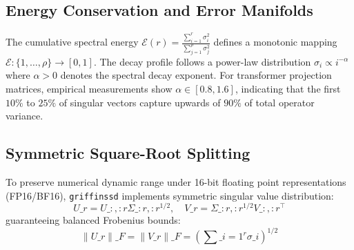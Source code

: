 \subsection{Energy Conservation and Error Manifolds}
The cumulative spectral energy $\mathcal{E}(r) = \frac{\sum_{i=1}^r \sigma_i^2}{\sum_{j=1}^\rho \sigma_j^2}$ defines a monotonic mapping $\mathcal{E}: \{1, \dots, \rho\} \to [0, 1]$. The decay profile follows a power-law distribution $\sigma_i \propto i^{-\alpha}$ where $\alpha > 0$ denotes the spectral decay exponent. For transformer projection matrices, empirical measurements show $\alpha \in [0.8, 1.6]$, indicating that the first $10\%$ to $25\%$ of singular vectors capture upwards of $90\%$ of total operator variance.

\subsection{Symmetric Square-Root Splitting}
To preserve numerical dynamic range under 16-bit floating point representations (FP16/BF16), \texttt{griffinssd} implements symmetric singular value distribution:
\[
U\_r = U\_{:, :r} \Sigma\_{:r, :r}^{1/2}, \quad V\_r = \Sigma\_{:r, :r}^{1/2} V\_{:, :r}^\top
\]
guaranteeing balanced Frobenius bounds:
\[
\|U\_r\|\_F = \|V\_r\|\_F = \left( \sum\_{i=1}^{r} \sigma\_i \right)^{1/2}
\]
